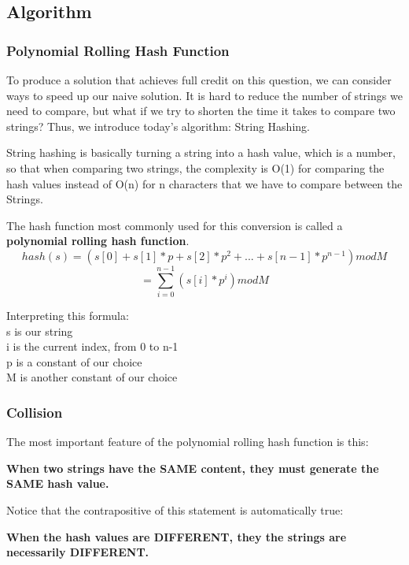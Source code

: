 \documentclass{article}
\begin{document}
\subsection{Algorithm}
\subsubsection{Polynomial Rolling Hash Function}
To produce a solution that achieves full credit on this question, we can consider ways to speed up our naive solution. It is hard to reduce the number of strings we need to compare, but what if we try to shorten the time it takes to compare two strings? Thus, we introduce today's algorithm: String Hashing.

\vspace{\baselineskip} 
String hashing is basically turning a string into a hash value, which is a number, so that when comparing two strings, the complexity is O(1) for comparing the hash values instead of O(n) for n characters that we have to compare between the Strings.

\vspace{\baselineskip} 
The hash function most commonly used for this conversion is called a \textbf{polynomial rolling hash function}.
\[ hash(s) = ( s[0] + s[1]*p + s[2]*p^2 + ... + s[n-1]*p^{n-1} ) mod M\]
\[ = \sum_{i=0}^{n-1} (s[i]*p^{i})  mod  M \]

Interpreting this formula:
\\s is our string
\\i is the current index, from 0 to n-1
\\p is a constant of our choice
\\M is another constant of our choice

\subsubsection{Collision}
The most important feature of the polynomial rolling hash function is this: 

\vspace{\baselineskip} 
\textbf{When two strings have the SAME content, they must generate the SAME hash value.}

\vspace{\baselineskip} 
Notice that the contrapositive of this statement is automatically true:

\vspace{\baselineskip} 
\textbf{When the hash values are DIFFERENT, they the strings are necessarily DIFFERENT.}
\end{document}
